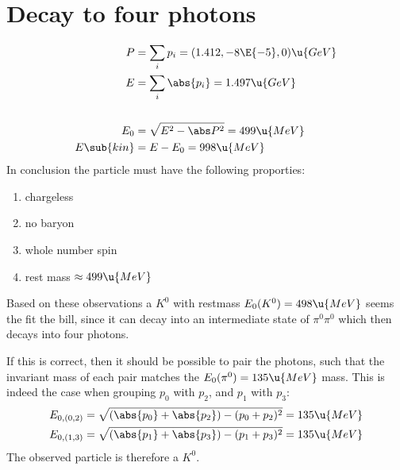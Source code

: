 \documentclass[exb, en]{exercise_5.0}
\begin{document}
\section{Decay to four photons}
\begin{align*}
    P &= \sum_i p_i = (1.412,-8\E{-5}, 0)\u{GeV}\\
    E &= \sum_i \abs{p_i} = 1.497\u{GeV}\\
    \\
    E_0 &= \sqrt{E^2-\abs P^2} = 499 \u{MeV}\\  
    E\sub{kin} &= E - E_0 = 998\u{{MeV}}
\end{align*}
In conclusion the particle must have the following proporties: 
\begin{enumerate}
    \item chargeless
    \item no baryon
    \item whole number spin
    \item rest mass $\approx 499\u{MeV}$
\end{enumerate}
Based on these observations a $K^0$ with restmass $E_0(K^0)=498\u{MeV}$ seems the fit the bill, since it can decay into an intermediate state of $\pi^0\pi^0$ which then decays into four photons. 

If this is correct, then it should be possible to pair the photons, such that the invariant mass of each pair matches the $E_0(\pi^0) = 135\u{MeV}$ mass. This is indeed the case when grouping $p_0$ with $p_2$, and $p_1$ with $p_3$:
\begin{align*}
    E_{0,(0,2)} &= \sqrt{(\abs{p_0}+\abs{p_2}) - (p_0 + p_2)^2} = 135\u{MeV}\\
    E_{0,(1,3)} &= \sqrt{(\abs{p_1}+\abs{p_3}) - (p_1 + p_3)^2} = 135\u{MeV}
\end{align*} 
The observed particle is therefore a $K^0$.
\end{document}
